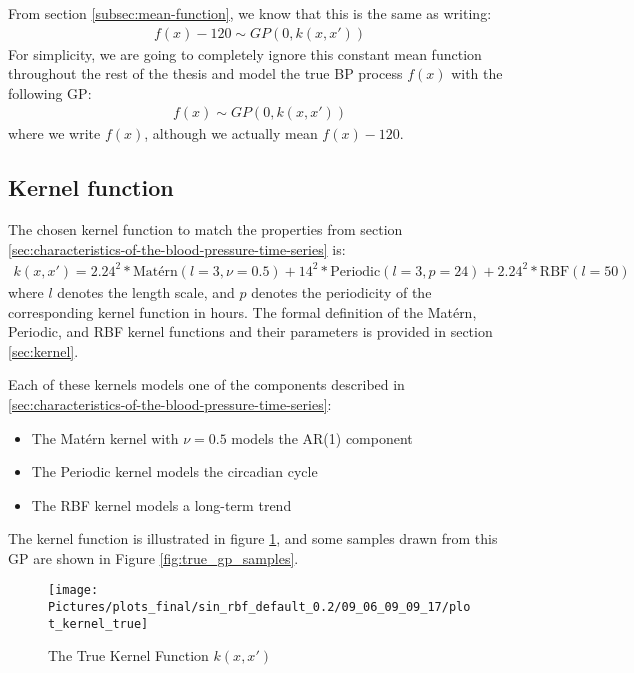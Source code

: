 From section \ref{subsec:mean-function}, we know that this is the same as writing:
\begin{gather*}
    f(x) - 120 \sim GP(0, k(x,x'))
\end{gather*}
For simplicity, we are going to completely ignore this constant
mean function throughout the rest of the thesis and
model the true BP process $f(x)$ with the following GP:
\begin{gather*}
    f(x) \sim GP(0, k(x,x'))
\end{gather*}
where we write $f(x)$, although we actually mean $f(x) - 120$.


\subsection{Kernel function}
The chosen kernel function to match the properties from
section \ref{sec:characteristics-of-the-blood-pressure-time-series} is:
\begin{gather*}\label{def:true_gp}
k(x, x') = 2.24^{2} * \text{Matérn}(l=3, \nu=0.5) +
14^{2} * \text{Periodic}(l=3, p=24) +  2.24^{2} * \text{RBF}(l=50)
\end{gather*}
where $l$ denotes the length scale, and $p$ denotes the periodicity
of the corresponding kernel function in hours.
The formal definition of the Matérn, Periodic, and RBF kernel
functions and their parameters is provided in section \ref{sec:kernel}.

Each of these kernels models one of the components described in
\ref{sec:characteristics-of-the-blood-pressure-time-series}:
\begin{itemize}
    \item The Matérn kernel with $\nu=0.5$ models the AR(1) component
    \item The Periodic kernel models the circadian cycle
    \item The RBF kernel models a long-term trend
\end{itemize}

The kernel function is illustrated in figure \ref{fig:true_kernel}, and
some samples drawn from this GP are shown in Figure \ref{fig:true_gp_samples}.

\begin{figure}[!htb]
    \centering
    \texttt{[image: Pictures/plots\_final/sin\_rbf\_default\_0.2/09\_06\_09\_09\_17/plot\_kernel\_true]}
    \caption{The True Kernel Function $k(x,x')$}
    \label{fig:true_kernel}
\end{figure}

